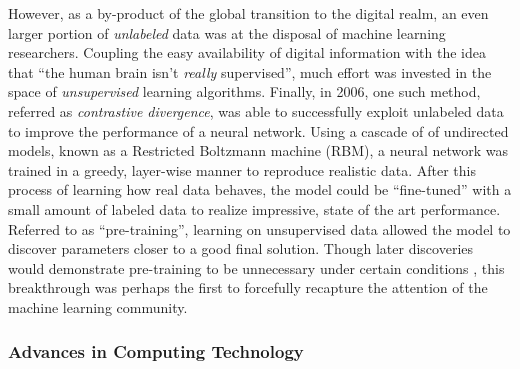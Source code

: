However, as a by-product of the global transition to the digital realm, an even larger portion of \emph{unlabeled} data was at the disposal of machine learning researchers.
Coupling the easy availability of digital information with the idea that ``the human brain isn't \emph{really} supervised'', much effort was invested in the space of \emph{unsupervised} learning algorithms. %
Finally, in 2006, one such method, referred as \emph{contrastive divergence}, was able to successfully exploit unlabeled data to improve the performance of a neural network.
Using a cascade of of undirected models, known as a Restricted Boltzmann machine (RBM), a neural network was trained in a greedy, layer-wise manner to reproduce realistic data.
After this process of learning how real data behaves, the model could be ``fine-tuned'' with a small amount of labeled data to realize impressive, state of the art performance.
Referred to as ``pre-training'', learning on unsupervised data allowed the model to discover parameters closer to a good final solution.
Though later discoveries would demonstrate pre-training to be unnecessary under certain conditions \cite{}, this breakthrough was perhaps the first to forcefully recapture the attention of the machine learning community.



\subsubsection{Advances in Computing Technology}
\label{subsubsec:hardware}

